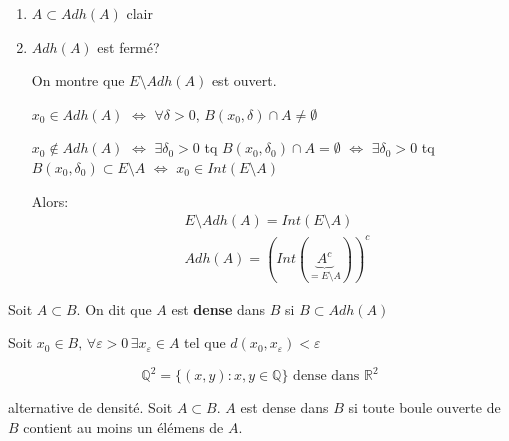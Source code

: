 \documentclass[a4paper]{report}
\newcommand\R{\ensuremath{\mathbb{R}}}
\renewcommand\O{\ensuremath{\emptyset}}
\newcommand\Q{\ensuremath{\mathbb{Q}}}
\let\iff\Leftrightarrow
\let\epsilon\varepsilon
\theoremstyle{definition}
\begin{document}
\begin{preuve}
   \begin{enumerate}
       \item $A \subset Adh(A)$ clair
       \item $Adh(A)$ est fermé?
           \par On montre que  $E \setminus Adh(A)$ est ouvert. \par 
           $x_0 \in Adh(A)$ $\iff$ $\forall \delta > 0, \, B(x_0, \delta) \cap A \neq \O$ \par
           $x_0 \not\in Adh(A)$ $\iff$ $\exists \delta_0 > 0$ tq $B(x_0, \delta_0) \cap A = \O$ $\iff$ $\exists \delta_0>0$ tq $B(x_0, \delta_0) \subset E\setminus A$ $\iff$ $x_0 \in Int(E\setminus A)$ 
           \par Alors:
           \begin{align*}
               &E \setminus Adh(A) = Int(E \setminus A)\\
               &Adh(A) = (Int(\underbrace{A^{c}}_{= E \setminus A}))^{c}
           \end{align*}
   \end{enumerate} 
\end{preuve}
\begin{definition}
    Soit $A \subset B$. On dit que $A$ est \textbf{dense} dans  $B$ si  $B \subset Adh(A)$
    \par
    Soit $x_0 \in B, \, \forall \epsilon > 0 \, \exists  x_{\epsilon} \in A$ tel que $d(x_0, x_{\epsilon}) < \epsilon$
\end{definition}
\begin{eg}
   \[
       \Q^2 = \{(x, y): x,y \in \Q\} \text{ dense dans } \R^2
   \]  
   
\end{eg}
\begin{definition}
    alternative de densité. Soit $A \subset B$. $A$ est dense dans  $B$ si toute boule ouverte de  $B$ contient au moins un élémens de  $A$.
\end{definition}
\end{document}
